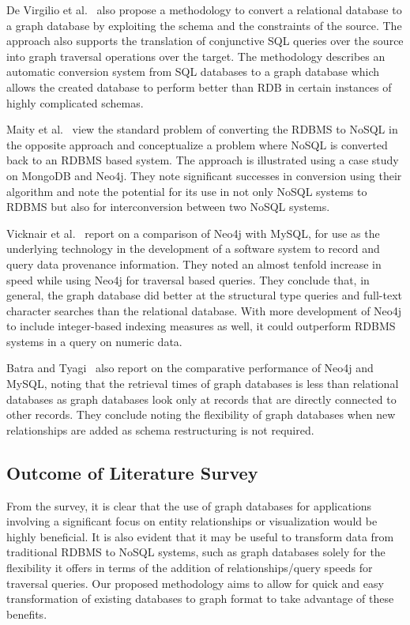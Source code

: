 \documentclass[12pt]{article}
\begin{document}
    De Virgilio et al.~\cite{rdbms2graph} also propose a methodology to convert a relational database to a graph database by exploiting the schema and the constraints of the source. The approach also supports the translation of conjunctive SQL queries over the source into graph traversal operations over the target. The methodology describes an automatic conversion system from SQL databases to a graph database which allows the created database to perform better than RDB in certain instances of highly complicated schemas.

    Maity et al.~\cite{nosql2rdbms} view the standard problem of converting the RDBMS to NoSQL in the opposite approach and conceptualize a problem where NoSQL is converted back to an RDBMS based system.  The approach is illustrated using a case study on MongoDB and Neo4j. They note significant successes in conversion using their algorithm and note the potential for its use in not only  NoSQL systems to RDBMS but also for interconversion between two NoSQL systems.

    Vicknair et al.~\cite{db_comparison} report on a comparison of Neo4j with MySQL, for use as the underlying technology in the development of a software system to record and query data provenance information. They noted an almost tenfold increase in speed while using Neo4j for traversal based queries. They conclude that, in general, the graph database did better at the structural type queries and full-text character searches than the relational database. With more development of Neo4j to include integer-based indexing measures as well, it could outperform RDBMS systems in a query on numeric data.

    Batra and Tyagi~\cite{rgdb_compare} also report on the comparative performance of Neo4j and MySQL, noting that the retrieval times of graph databases is less than relational databases as graph databases look only at records that are directly connected to other records. They conclude noting the flexibility of graph databases when new relationships are added as schema restructuring is not required.

    \subsection{Outcome of Literature Survey}
    From the survey, it is clear that the use of graph databases for applications involving a significant focus on entity relationships or visualization would be highly beneficial. It is also evident that it may be useful to transform data from traditional RDBMS to NoSQL systems, such as graph databases solely for the flexibility it offers in terms of the addition of relationships/query speeds for traversal queries. Our proposed methodology aims to allow for quick and easy transformation of existing databases to graph format to take advantage of these benefits. 
\end{document}
